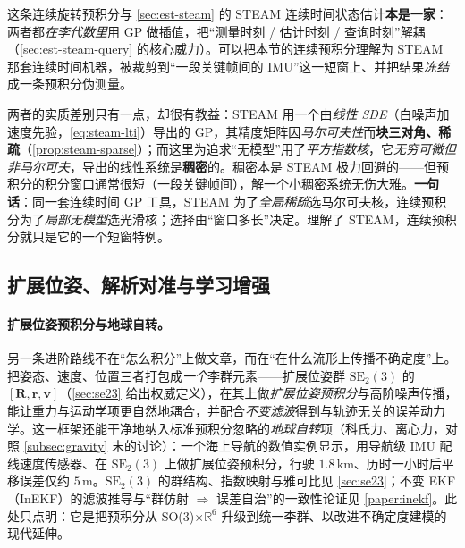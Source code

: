 \begin{insight}\label{ins:preint-steam}
这条连续旋转预积分与 \cref{sec:est-steam} 的 STEAM 连续时间状态估计\textbf{本是一家}：两者都\emph{在李代数里}用 GP 做插值，把“测量时刻 / 估计时刻 / 查询时刻”解耦（\cref{sec:est-steam-query} 的核心威力）。可以把本节的连续预积分理解为 STEAM 那套连续时间机器，被裁剪到“一段关键帧间的 IMU”这一短窗上、并把结果\emph{冻结}成一条预积分伪测量。

两者的实质差别只有一点，却很有教益：STEAM 用一个由\emph{线性 SDE}（白噪声加速度先验，\cref{eq:steam-lti}）导出的 GP，其精度矩阵因\emph{马尔可夫性}而\textbf{块三对角、稀疏}（\cref{prop:steam-sparse}）；而这里为追求“无模型”用了\emph{平方指数核}，它\emph{无穷可微但非马尔可夫}，导出的线性系统是\textbf{稠密}的。稠密本是 STEAM 极力回避的——但预积分的积分窗口通常很短（一段关键帧间），解一个小稠密系统无伤大雅。\textbf{一句话}：同一套连续时间 GP 工具，STEAM 为了\emph{全局稀疏}选马尔可夫核，连续预积分为了\emph{局部无模型}选光滑核；选择由“窗口多长”决定。理解了 STEAM，连续预积分就只是它的一个短窗特例。
\end{insight}

\subsection{扩展位姿、解析对准与学习增强}
\label{subsec:advanced-misc}

\paragraph{扩展位姿预积分与地球自转。}
另一条进阶路线不在“怎么积分”上做文章，而在“在什么流形上传播不确定度”上。把姿态、速度、位置三者打包成\emph{一个}李群元素——扩展位姿群 $\mathrm{SE}_2(3)$ 的 $[\mathbf R,\mathbf r,\mathbf v]$（\cref{sec:se23} 给出权威定义），在其上做\emph{扩展位姿预积分}与高阶噪声传播，能让重力与运动学项更自然地耦合，并配合\emph{不变滤波}得到与轨迹无关的误差动力学\cite{brossard2021associating}。这一框架还能干净地纳入标准预积分忽略的\emph{地球自转}项（科氏力、离心力，对照 \cref{subsec:gravity} 末的讨论）：一个海上导航的数值实例显示，用导航级 IMU 配线速度传感器、在 $\mathrm{SE}_2(3)$ 上做扩展位姿预积分，行驶 $1.8\,\mathrm{km}$、历时一小时后平移误差仅约 $5\,\mathrm m$\cite{carlone2026handbook}。$\mathrm{SE}_2(3)$ 的群结构、指数映射与雅可比见 \cref{sec:se23}；不变 EKF（InEKF）的滤波推导与“群仿射 $\Rightarrow$ 误差自治”的一致性论证见 \cref{paper:inekf}。此处只点明：它是把预积分从 SO(3)$\times\mathbb R^6$ 升级到统一李群、以改进不确定度建模的现代延伸。

